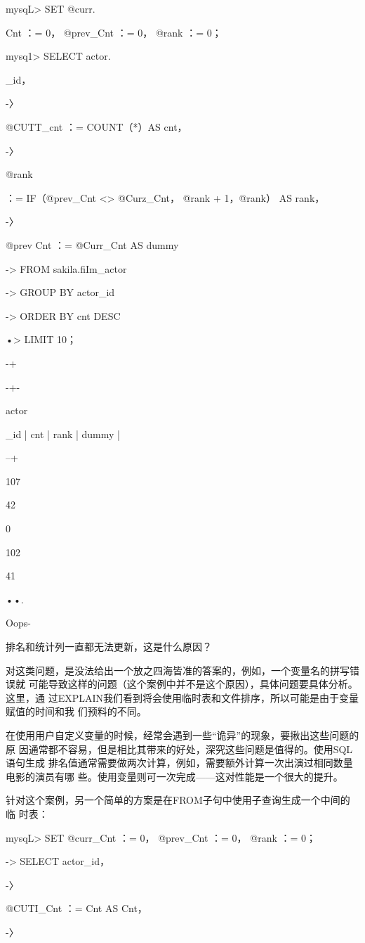 mysqL> SET @curr.

Cnt ：= 0， @prev\_Cnt ：= 0， @rank ：= 0；

mysq1> SELECT actor.

\_id，

-〉

@CUTT\_cnt ：= COUNT（*）AS cnt，

-〉

@rank

：= IF（@prev\_Cnt <> @Curz\_Cnt， @rank + 1，@rank） AS rank，

-〉

@prev Cnt ：= @Curr\_Cnt AS dummy

-> FROM sakila.fiIm\_actor

-> GROUP BY actor\_id

-> ORDER BY cnt DESC

•> LIMIT 10；

-+

-+-

actor

\_id | cnt | rank | dummy |

--+

107

42

0

102

41

••.

Oops-

排名和统计列一直都无法更新，这是什么原因？

对这类问题，是没法给出一个放之四海皆准的答案的，例如，一个变量名的拼写错误就
可能导致这样的问题（这个案例中并不是这个原因），具体问题要具体分析。这里，通
过EXPLAIN我们看到将会使用临时表和文件排序，所以可能是由于变量赋值的时间和我
们预料的不同。

在使用用户自定义变量的时候，经常会遇到一些“诡异”的现象，要揪出这些问题的原
因通常都不容易，但是相比其带来的好处，深究这些问题是值得的。使用SQL 语句生成
排名值通常需要做两次计算，例如，需要额外计算一次出演过相同数量电影的演员有哪
些。使用变量则可一次完成——这对性能是一个很大的提升。

针对这个案例，另一个简单的方案是在FROM子句中使用子查询生成一个中间的临
时表：

mysqL> SET @curr\_Cnt ：= 0， @prev\_Cnt ：= 0， @rank ：= 0；

-> SELECT actor\_id，

-〉

@CUTI\_Cnt ：= Cnt AS Cnt，

-〉

